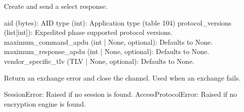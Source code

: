\documentclass[letterpaper,10pt,english]{sphinxmanual}
\begin{document}
\begin{fulllineitems}
\begin{fulllineitems}
\label{\detokenize{aliro_actuator.access_protocol.user_device:aliro_actuator.access_protocol.user_device.UserDevice.response_select}}
\pysigstartsignatures
{}
\pysigstopsignatures
\sphinxAtStartPar
Create and send a select response.
\begin{description}
\sphinxAtStartPar
aid (bytes): AID
type (int): Application type (table 10\sphinxhyphen{}4)
protocol\_versions (list{[}int{]}): Expedited phase supported protocol versions.
maximum\_command\_apdu (int | None, optional): Defaults to None.
maximum\_response\_apdu (int | None, optional): Defaults to None.
vendor\_specific\_tlv (TLV | None, optional): Defaults to None.

\end{description}

\end{fulllineitems}


\begin{fulllineitems}
\label{\detokenize{aliro_actuator.access_protocol.user_device:aliro_actuator.access_protocol.user_device.UserDevice.return_exchange_error_and_close_channel}}
\pysigstartsignatures
{}
\pysigstopsignatures
\sphinxAtStartPar
Return an exchange error and close the channel.
Used when an exchange fails.
\begin{description}
\sphinxAtStartPar
SessionError: Raised if no session is found.
AccessProtocolError: Raised if no encryption engine is found.


\end{description}
\end{fulllineitems}
\end{fulllineitems}
\end{document}
